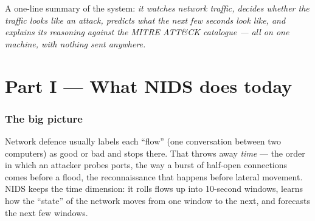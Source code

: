 \documentclass[11pt,a4paper]{article}
\begin{document}
A one-line summary of the system: \emph{it watches network traffic, decides
whether the traffic looks like an attack, predicts what the next few seconds
look like, and explains its reasoning against the MITRE ATT\&CK catalogue ---
all on one machine, with nothing sent anywhere.}

\clearpage
\part*{Part I --- What NIDS does today}

\section{The big picture}

Network defence usually labels each ``flow'' (one conversation between two
computers) as good or bad and stops there. That throws away \emph{time} --- the
order in which an attacker probes ports, the way a burst of half-open
connections comes before a flood, the reconnaissance that happens before
lateral movement. NIDS keeps the time dimension: it rolls flows up into
10-second windows, learns how the ``state'' of the network moves from one window
to the next, and forecasts the next few windows.
\end{document}
